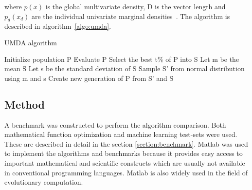 where $p(x)$ is the global multivariate density, D is the vector length and $p_d(x_d)$ are the individual univariate marginal densities~\cite{povsik2004estimation}. The algorithm is described in algorithm~\ref{algo:umda}.

\begin{algorithm}[h]
  \caption{UMDA algorithm}
  \label{algo:umda}

    \begin{algorithmic}
      \State Initialize population P
      \Repeat
        \State Evaluate P
        \State Select the best t\% of P into S
        \State Let m be the mean S
        \State Let s be the standard deviation of S
        \State Sample S' from normal distribution using m and s
        \State Create new generation of P from S' and S
    \end{algorithmic}

\end{algorithm}

\subsection{Method}

A benchmark was constructed to perform the algorithm comparison. Both mathematical function optimization and machine learning test-sets were used. These are described in detail in the section \ref{section:benchmark}. Matlab was used to implement the algorithms and benchmarks because it provides easy access to important mathematical and scientific constructs which are usually not available in conventional programming languages. Matlab is also widely used in the field of evolutionary computation.
